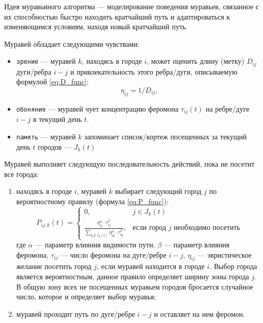 Идея муравьиного алгоритма \cite{info_antAlg} --- моделирование поведения муравьев, связанное с их способностью быстро находить кратчайший путь и адаптироваться к изменяющимся условиям, находя новый кратчайший путь.

Муравей обладает следующими чувствами:

\begin{itemize}[label*=--]
	\item \texttt{зрение} --- муравей $k$, находясь в городе $i$, может оценить длину (метку) $D_{ij}$ дуги/ребра $i-j$ и привлекательность этого ребра/дуги, описываемую формулой \ref{eq:D_func}:
	\begin{equation}
		\label{eq:D_func}
		\eta_{ij} = 1 / D_{ij},
	\end{equation}
	
	\item \texttt{обоняние} --- муравей чует концентрацию феромона $\tau_{ij}(t)$ на ребре/дуге $i-j$ в текущий день $t$.
	
	\item \texttt{память} --- муравей $k$ запоминает список/кортеж посещенных за текущий день $t$ городов --- $J_k(t)$
\end{itemize}

Муравей выполняет следующую последовательность действий, пока не посетит все города:

\begin{enumerate}[label={\arabic*)}]
	\item находясь в городе $i$, муравей $k$ выбирает следующий город $j$ по вероятностному правилу (формула \ref{eq:P_func}):
	\begin{equation}
		\label{eq:P_func}
		P_{ij, k}(t) = 
		\begin{cases}
			0,  & j \in J_k(t) \\
			\frac{\eta_{ij}^\alpha \cdot \tau_{ij}^\beta}{\displaystyle\sum_{q \notin J_k(t)} \eta^\alpha_{iq} \cdot \tau^\beta_{iq}}, & \textrm{если город $j$ необходимо посетить} 
		\end{cases}
	\end{equation}
	где $\alpha$ --- параметр влияния видимости пути, $\beta$ --- параметр влияния феромона, $\tau_{ij}$ --- число феромона на дуге/ребре $i-j$, $\eta_{ij}$ --- эвристическое желание посетить город $j$, если муравей находится в городе $i$. 
	Выбор города является вероятностным, данное правило определяет ширину зоны города $j$. 
	В общую зону всех не посещенных муравьем городов бросается случайное число, которое и определяет выбор муравья;
	\item муравей проходит путь по дуге/ребре $i-j$ и оставляет на нем феромон.
\end{enumerate}

